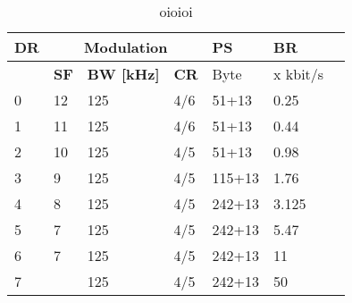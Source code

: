 \begin{table}[h!]
\scriptsize
	\begin{tabular}{l|l|l|l|l|l|l}
	\textbf{\ac{DR}}  & \multicolumn{3}{c|}{\textbf{Modulation}}													& \ac{PS}						    & \textbf{\ac{BR}}  \\\hline
	\                 & \textbf{\ac{SF}}                          	& \textbf{\ac{BW} [kHz]} 	& \textbf{\ac{CR}}  & Byte						 		& x kbit/s 			\\\hline
	0                 & 12                                        	& 125               		& 4/6         		& 51+13                   			& 0.25     			\\\hline
	1                 & 11                                        	& 125               		& 4/6         		& 51+13                   			& 0.44     			\\\hline
	2                 & 10                                        	& 125               		& 4/5         		& 51+13                   			& 0.98     			\\\hline
	3                 & 9                                         	& 125               		& 4/5         		& 115+13                  			& 1.76     			\\\hline
	4                 & 8                                         	& 125               		& 4/5         		& 242+13                  			& 3.125    			\\\hline
	5                 & 7                                         	& 125               		& 4/5         		& 242+13                 			& 5.47     			\\\hline
	6                 & 7                                         	& 125               		& 4/5         		& 242+13                 			& 11       			\\\hline
	7                 &                                           	& 125               		& 4/5         		& 242+13                 			& 50       			\\\hline
	\end{tabular}
\caption{\label{tab:llo}oioioi }
\end{table}

\clearpage
\newpage
\twocolumn
\restoregeometry